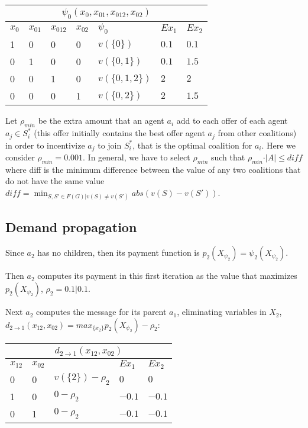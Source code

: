 \documentclass{article}
\begin{document}
\noindent\begin{tabular}{ | l | l |  l | l | l | l | l |}
\multicolumn{7}{c}{$\psi_0(x_{0},x_{01},x_{012},x_{02})$}  \\
\hline
	$x_{0}$ &	$x_{01}$ & $x_{012}$ &  $x_{02}$ & $\psi_0$ &$Ex_1$ & $Ex_2$\\
\hline
	1	 &		0	 &  0	&  0 & $v(\{0\})$ & $0.1$ &  $0.1$\\
	0	 &		1	 &	0 	&  0 & $v(\{0,1\})$ & $0.1$ & $1.5$\\
	0	 &		0	 &  1	&  0 & $v(\{0,1,2\})$ & $2$ &$2$ \\
	0	 &		0	 &  0	&  1 & $v(\{0,2\})$ & $2$ &$1.5$ \\
\hline
\end{tabular}



\noindent Let $\rho_{min}$ be the extra amount that an agent $a_i$ add to each
offer of each agent $a_j\in S^*_i$ (this offer initially contains the best
offer agent $a_j$ from other coalitions) in order to incentivize $a_j$ to join
$S^*_i$, that is the optimal coalition for $a_i$. Here we consider
$\rho_{min}=0.001$. In general, we have to select $\rho_{min}$ such that $\rho_{min}\cdot \vert A
\vert \leq diff$ where diff is the minimum difference between the value of
any two coalitions that do not have the same value $diff = \min_{ S,S'\in
F(G)\vert v(S)\neq v(S')} abs( v(S)-v(S'))$.

\subsection{Demand propagation}


\noindent Since $a_2$ has no children, then its payment function is
$p_2(X_{\psi_2})=\psi_2(X_{\psi_2})$.

\vspace{0.1in}\noindent Then $a_2$ computes its payment in this first iteration
as the value that maximizes $p_2(X_{\psi_2})$, $\rho_2 = 0.1 \vert 0.1$.

\vspace{0.1in}\noindent Next $a_2$ computes the message for its parent $a_1$,
eliminating variables in $X_2$, $d_{2\rightarrow 1}(x_{12},x_{02}) =
max_{\{x_2\}} p_2(X_{\psi_2}) -\rho_2$:


\noindent\begin{tabular}{ | l | l | l |l | l |}
\multicolumn{5}{c}{$d_{2\rightarrow 1}(x_{12},x_{02})$}  \\
\hline
	$x_{12}$ & $x_{02}$ &  & $Ex_1$ & $Ex_2$\\
\hline
	0	 & 0 &	$v(\{2\})-\rho_2$ & $0$ & $0$ \\
	1	 & 0 &	$0 -\rho_2 $ & $-0.1$ & $-0.1$\\
	0    & 1 &  $0 -\rho_2 $ & $-0.1$ & $-0.1$\\
\hline
\end{tabular}
\end{document}
